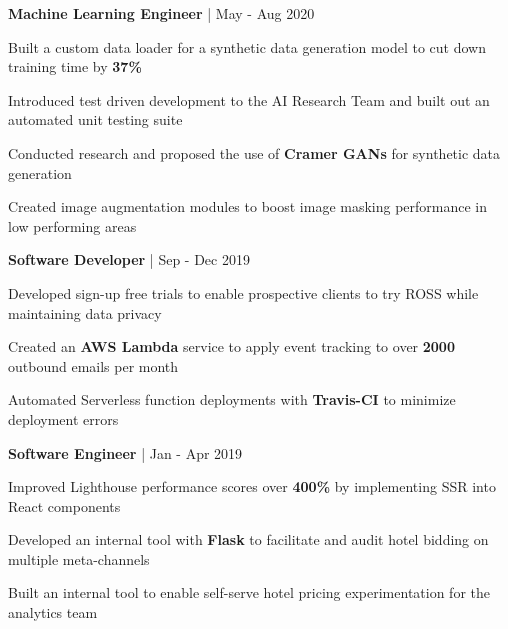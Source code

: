 \begin{cventries}

\cventry
{\textbf{Machine Learning Engineer} | \color{awesome}{PerkinElmer}}
{May - Aug 2020} %
{ %
\begin{cvitems}
\item {Built a custom data loader for a synthetic data generation model to cut down training time by \textbf{37\%}}
\item {Introduced test driven development to the AI Research Team and built out an automated unit testing suite}
\item {Conducted research and proposed the use of \textbf{Cramer GANs} for synthetic data generation}
\item {Created image augmentation modules to boost image masking performance in low performing areas}
\end{cvitems}
}


\cventry
{\textbf{Software Developer} | \color{awesome}{ROSS Intelligence}}
{Sep - Dec 2019} %
{ %
\begin{cvitems}
\item {Developed sign-up free trials to enable prospective clients to try ROSS while maintaining data privacy}
\item {Created an \textbf{AWS Lambda} service to apply event tracking to over \textbf{2000} outbound emails per month}
\item {Automated Serverless function deployments with \textbf{Travis-CI} to minimize deployment errors}
\end{cvitems}
}


\cventry
{\textbf{Software Engineer} | \color{awesome}{Super}}
{Jan - Apr 2019} %
{ %
\begin{cvitems}
\item {Improved Lighthouse performance scores over \textbf{400\%} by implementing SSR into React components}
\item {Developed an internal tool with \textbf{Flask} to facilitate and audit hotel bidding on multiple meta-channels}
\item {Built an internal tool to enable self-serve hotel pricing experimentation for the analytics team}
\end{cvitems}
}


\end{cventries}
